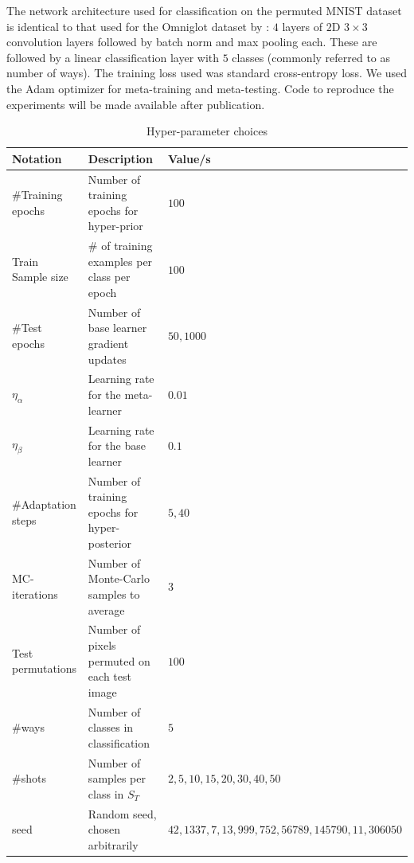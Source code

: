 \documentclass{article} %
\theoremstyle{definition}
\newcommand{\RM}[1]{\textcolor{magenta}{\{RM: #1\}}}
\begin{document}
The network architecture used for classification on the permuted MNIST dataset is identical to that used for the Omniglot dataset by \citet{Vinyals2016}: $4$ layers of $2$D $3\times 3$ convolution layers followed by batch norm and max pooling each. These are followed by a linear classification layer with $5$ classes (commonly referred to as number of ways). The training loss used was standard cross-entropy loss. We used the Adam optimizer \citep{Kingma2015} for meta-training and meta-testing. 
Code to reproduce the experiments will be made available after publication.

\begin{table}[ht]	
	
	\centering
	\begin{tabular}{lll}
		\toprule
		Notation   & Description  & Value/s   \\
		\midrule
		\#Training epochs & Number of training epochs for hyper-prior   & $100$      \\
		\midrule
		Train Sample size & \# of training examples per class per epoch   & $100$      \\
		\midrule
		\#Test epochs & Number of base learner gradient updates   & $50,1000$      \\
		\midrule
		$\eta_{\alpha}$  & Learning rate for the meta-learner   & $0.01$      \\
		\midrule
		$\eta_{\beta}$  & Learning rate for the base learner   & $0.1$      \\
		\midrule
		\#Adaptation steps  & Number of training epochs for hyper-posterior   & $5,40$      \\
		\midrule
		MC-iterations & Number of Monte-Carlo samples to average & $3$\\
		\midrule
		Test permutations  & Number of pixels permuted on each test image   & $100$      \\
		\midrule
		\#ways & Number of classes in classification & $5$\\
		\midrule
		\#shots & Number of samples per class in $S_T$ & $2,5,10,15,20,30,40,50$\\
		\midrule
		seed & Random seed, chosen arbitrarily & $42,1337,7,13,999,752,56789,145790,11,306050$\\
		\bottomrule
	\end{tabular}
	\caption{Hyper-parameter choices}
	\label{table:hyper-params}
\end{table}
\end{document}
